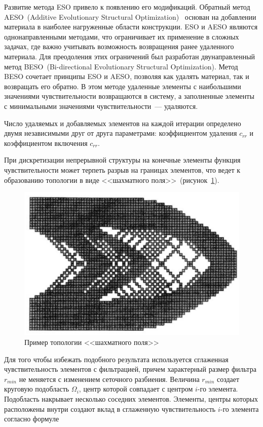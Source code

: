 Развитие метода ESO привело к появлению его модификаций. 
Обратный метод AESO~(Additive Evolutionary Structural Optimization)~\cite{Querin2000} основан на добавлении материала в наиболее нагруженные области конструкции. 
ESO и AESO являются однонаправленными методами, что ограничивает их применение в сложных задачах, где важно учитывать возможность возвращения ранее удаленного материала. Для преодоления этих ограничений был разработан двунаправленный метод BESO~(Bi-directional Evolutionary Structural Optimization){\cite{Querin1998, Yang1999}}. Метод BESO сочетает принципы ESO и AESO, позволяя как удалять материал, так и возвращать его обратно. В этом методе удаленные элементы с наибольшими значениями чувствительности возвращаются в систему, а заполненные элементы с минимальными значениями чувствительности~--- удаляются. 

Число удаляемых и добавляемых элементов на каждой итерации определено двумя независимыми друг от друга параметрами: коэффициентом удаления $c_{rr}$ и коэффициентом включения $c_{rr}$. 

При дискретизации непрерывной структуры на конечные элементы функция чувствительности может терпеть разрыв на границах элементов, что ведет к образованию топологии в виде <<шахматного поля>>~(рисунок~\cref{fig:chess_topology}).

\begin{figure}[ht]
	\centering 
	\includegraphics[scale=0.5]{Dissertation/images/chess.png} 
	\caption{Пример топологии <<шахматного поля>>}\label{fig:chess_topology}
\end{figure}

Для того чтобы избежать подобного результата используется сглаженная чувствительность элементов с фильтрацией, причем характерный размер фильтра $r_{min}$ не меняется с изменением сеточного разбиения. Величина $r_{min}$ создает круговую подобласть $\Omega_i$, центр которой совпадает с центром $i$-го элемента. Подобласть   накрывает несколько соседних элементов. Элементы, центры которых расположены внутри   создают вклад в сглаженную чувствительность $i$-го элемента согласно формуле

